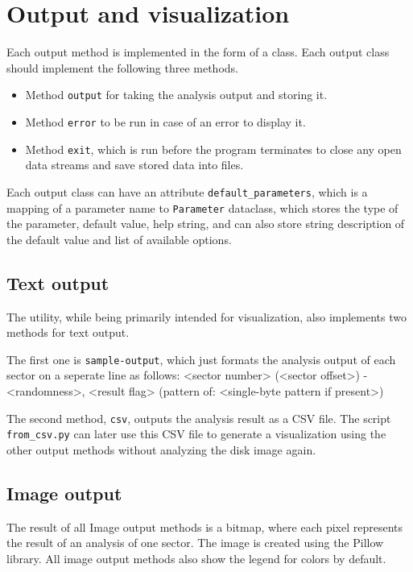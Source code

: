 \documentclass[
  digital, %
  oneside, %
  lof,     %
  lot,     %
]{fithesis4}
\begin{document}
\section{Output and visualization}

Each output method is implemented in the form of a class.
Each output class should implement the following three methods.
\begin{itemize}
    \item Method \texttt{output} for taking the analysis output and storing it.
    \item Method \texttt{error} to be run in case of an error to display it.
    \item Method \texttt{exit}, which is run before the program terminates to close any open data streams and save stored data into files.
\end{itemize}
Each output class can have an attribute \texttt{default\_parameters}, which is a mapping of a parameter name to \texttt{Parameter} dataclass, which stores the type of the parameter, default value, help string, and can also store string description of the default value and list of available options.

\subsection{Text output}

The utility, while being primarily intended for visualization, also implements two methods for text output.

The first one is \texttt{sample-output}, which just formats the analysis output of each sector on a seperate line as follows: <sector number> (<sector offset>) - <randomness>, <result flag> (pattern of: <single-byte pattern if present>)

The second method, \texttt{csv}, outputs the analysis result as a CSV file.
The script \texttt{from\_csv.py} can later use this CSV file to generate a visualization using the other output methods without analyzing the disk image again.

\subsection{Image output}

The result of all Image output methods is a bitmap, where each pixel represents the result of an analysis of one sector.
The image is created using the Pillow library.
All image output methods also show the legend for colors by default.
\end{document}
